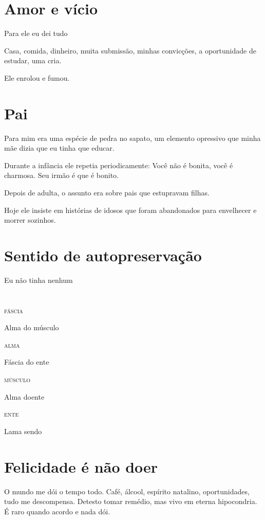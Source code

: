 \chapter{Amor e vício}

Para ele eu dei tudo
{\parindent0pt\parskip1pt\raggedright

Casa, comida, dinheiro, muita submissão, minhas convicções, a
oportunidade de estudar, uma cria.

Ele enrolou e fumou.
}

\chapter{Pai}

Para mim era uma espécie de pedra no sapato, um elemento opressivo que
minha mãe dizia que eu tinha que educar.

Durante a infância ele repetia periodicamente: Você não é bonita, você é
charmosa. Seu irmão é que é bonito.

Depois de adulta, o assunto era sobre pais que estupravam filhas.

Hoje ele insiste em histórias de idosos que foram abandonados para
envelhecer e morrer sozinhos.

\chapter{Sentido de autopreservação}

Eu não tinha nenhum

\pagebreak
\chapter*{}

{\parindent0pt\parskip1pt\raggedright
\textsc{fáscia}

Alma do músculo\medskip

\textsc{alma}

Fáscia do ente\medskip

\textsc{músculo}

Alma doente\medskip

\textsc{ente}

Lama sendo}

\chapter{Felicidade é não doer}

O mundo me dói o tempo todo. Café, álcool, espírito natalino,
oportunidades, tudo me descompensa. Detesto tomar remédio, mas vivo em
eterna hipocondria. É raro quando acordo e nada dói.

